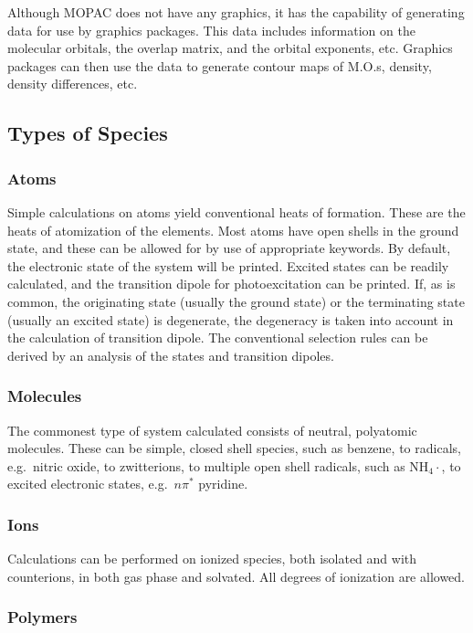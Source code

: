 Although MOPAC does not have any graphics, it has the capability of  generating
data for use by graphics packages.  This data includes information on  the
molecular orbitals, the overlap matrix, and the orbital exponents, etc.
Graphics packages can then use the data to generate contour maps of M.O.s,
density, density differences, etc.

\subsection{Types of Species}

\subsubsection*{Atoms}

Simple calculations on atoms yield conventional heats of formation.  These are
the heats of atomization of the elements.  Most atoms have open shells in the
ground state, and these can be allowed for by use of appropriate keywords.  By
default, the electronic state of the system will be printed.  Excited states
can be  readily calculated, and the transition dipole for photoexcitation can
be printed.   If, as is common, the originating state (usually the ground
state) or the  terminating state (usually an excited state) is degenerate, the
degeneracy is taken  into account in the calculation of transition dipole.  The
conventional selection  rules can be derived by an analysis of the states and
transition dipoles.

\subsubsection*{Molecules}

The commonest type of system calculated consists of neutral, polyatomic
molecules.  These can be simple, closed shell species, such as benzene, to
radicals, e.g.\ nitric oxide, to zwitterions, to multiple open shell radicals,
such as NH$_{4}\cdot$, to excited electronic states, e.g.\ $n\pi^{*}$ pyridine.

\subsubsection*{Ions}

Calculations can be performed on ionized species, both isolated and with
counterions, in both gas phase and solvated.  All degrees of ionization are
allowed.

\subsubsection*{Polymers}

